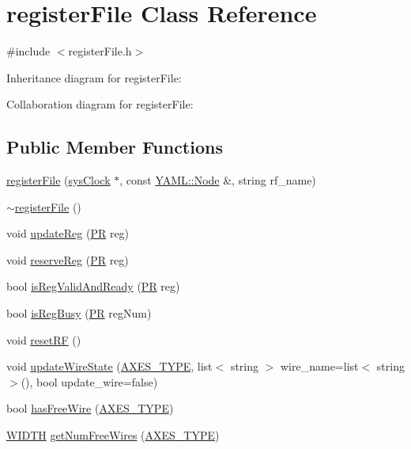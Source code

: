 \hypertarget{classregisterFile}{
\section{registerFile Class Reference}
\label{classregisterFile}
}


{\ttfamily \#include $<$registerFile.h$>$}



Inheritance diagram for registerFile:


Collaboration diagram for registerFile:
\subsection*{Public Member Functions}
\begin{DoxyCompactItemize}
\item 
\hyperlink{classregisterFile_a61390ea0709a40a1e48dac5133242c9d}{registerFile} (\hyperlink{classsysClock}{sysClock} $\ast$, const \hyperlink{classYAML_1_1Node}{YAML::Node} \&, string rf\_\-name)
\item 
\hyperlink{classregisterFile_a51d44388ce9baf55f5d0fc108198d915}{$\sim$registerFile} ()
\item 
void \hyperlink{classregisterFile_a57aa14508810da286ee60ef6cd033d6b}{updateReg} (\hyperlink{global_2global_8h_a54dcae2ba04c76c12afe113b706bd4dc}{PR} reg)
\item 
void \hyperlink{classregisterFile_a2731695462957c3ac0a8888e7fce3bd3}{reserveReg} (\hyperlink{global_2global_8h_a54dcae2ba04c76c12afe113b706bd4dc}{PR} reg)
\item 
bool \hyperlink{classregisterFile_a6b9481a788749aabdc8488f60adb5cf7}{isRegValidAndReady} (\hyperlink{global_2global_8h_a54dcae2ba04c76c12afe113b706bd4dc}{PR} reg)
\item 
bool \hyperlink{classregisterFile_af4bc17e8db0bd9a07fec85814e1d607f}{isRegBusy} (\hyperlink{global_2global_8h_a54dcae2ba04c76c12afe113b706bd4dc}{PR} regNum)
\item 
void \hyperlink{classregisterFile_a9e487acbcecb5a905a4ee1c80adf48e4}{resetRF} ()
\item 
void \hyperlink{classregisterFile_a47232ba732ea081d78cd43d0564e60a1}{updateWireState} (\hyperlink{binaryTranslator_2global_8h_a94b8423a23b95a7adac22848b81e7c0c}{AXES\_\-TYPE}, list$<$ string $>$ wire\_\-name=list$<$ string $>$(), bool update\_\-wire=false)
\item 
bool \hyperlink{classregisterFile_a218ab11def5221efa38b4fb84817c4a6}{hasFreeWire} (\hyperlink{binaryTranslator_2global_8h_a94b8423a23b95a7adac22848b81e7c0c}{AXES\_\-TYPE})
\item 
\hyperlink{global_2global_8h_a6fa2e24b8a418fa215e183264cbea3aa}{WIDTH} \hyperlink{classregisterFile_ad2643ae67021e5dc1a2218b19093bdd0}{getNumFreeWires} (\hyperlink{binaryTranslator_2global_8h_a94b8423a23b95a7adac22848b81e7c0c}{AXES\_\-TYPE})
\end{DoxyCompactItemize}


